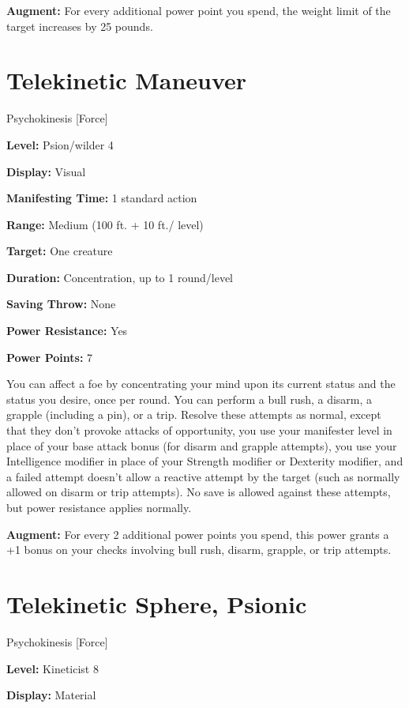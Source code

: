 \documentclass{article}
\begin{document}
\textbf{Augment:} For every additional power point you spend, the weight limit 
of the target increases by 25 pounds.

\vspace{12pt}
\section*{Telekinetic Maneuver}

Psychokinesis [Force]

\textbf{Level:} Psion/wilder 4

\textbf{Display:} Visual

\textbf{Manifesting Time:} 1 standard action

\textbf{Range:} Medium (100 ft. + 10 ft./ level)

\textbf{Target:} One creature

\textbf{Duration:} Concentration, up to 1 round/level

\textbf{Saving Throw:} None

\textbf{Power Resistance:} Yes

\textbf{Power Points:} 7

You can affect a foe by concentrating your mind upon its current status and the 
status you desire, once per round. You can perform a bull rush, a disarm, a grapple 
(including a pin), or a trip. Resolve these attempts as normal, except that they 
don't provoke attacks of opportunity, you use your manifester level in place of 
your base attack bonus (for disarm and grapple attempts), you use your Intelligence 
modifier in place of your Strength modifier or Dexterity modifier, and a failed 
attempt doesn't allow a reactive attempt by the target (such as normally allowed 
on disarm or trip attempts). No save is allowed against these attempts, but power 
resistance applies normally.

\textbf{Augment:} For every 2 additional power points you spend, this power grants 
a +1 bonus on your checks involving bull rush, disarm, grapple, or trip attempts.

\vspace{12pt}
\section*{Telekinetic Sphere, Psionic}

Psychokinesis [Force]

\textbf{Level:} Kineticist 8

\textbf{Display:} Material
\end{document}
